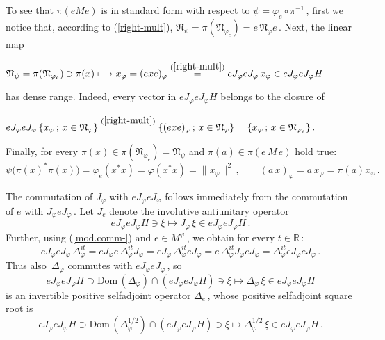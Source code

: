 \documentclass[reqno]{amsart}
\theoremstyle{definition}
\theoremstyle{remark}
\numberwithin{equation}{section}
\theoremstyle{plain}
\begin{document}
To see that $\pi (e M e)$ is in standard form with respect to
$\psi =\varphi_e\circ\pi^{-1}\,$, first we notice that, according
to (\ref{right-mult}), $\mathfrak N_\psi =
\pi (\mathfrak N_{\varphi_e}) =e\,\mathfrak N_\varphi e\,$.
Next, the linear map
\begin{center}
$\mathfrak N_\psi =\pi (\mathfrak N_{\varphi_e})\ni\pi (x)
\longmapsto x_\varphi =(e x e)_\varphi
\overset{(\ref{right-mult})}{=} eJ_\varphi eJ_\varphi\, x_\varphi
\in e J_\varphi e J_\varphi H$
\end{center}
\smallskip
has dense range. Indeed, every vector in $eJ_\varphi eJ_\varphi H$
belongs to the closure of
\begin{center}
$eJ_\varphi eJ_\varphi\,\{ x_\varphi\, ;\, x\in\mathfrak N_\varphi\}
\overset{(\ref{right-mult})}{=} \{ (e x e)_\varphi\, ;\,
x\in\mathfrak N_\varphi\} = \{ x_\varphi\, ;\, x\in
\mathfrak N_{\varphi_e} \}\, .$
\end{center}
\smallskip
Finally, for every $\pi (x)\in\pi (\mathfrak N_{\varphi_e})
=\mathfrak N_\psi$ and $\pi (a)\in\pi (e\, M\, e)$ hold true:
\begin{equation*}
\psi\big( \pi (x)^*\pi (x)\big) =\varphi_e (x^*x) =\varphi (x^*x)
=\| x_\varphi\|^2\, ,\qquad (a\, x)_\varphi =a\, x_\varphi =
\pi (a) x_\varphi\, .
\end{equation*}

The commutation of $J_\varphi$ with $e J_\varphi e J_\varphi$
follows immediately from the commutation of $e$ with $J_\varphi
e J_\varphi\,$. Let $J_e$ denote the involutive antiunitary
operator
\begin{equation*}
e J_\varphi e J_\varphi H\ni\xi\longmapsto J_\varphi\,\xi\in
e J_\varphi e J_\varphi H\, .
\end{equation*}
Further, using (\ref{mod.comm-}) and
$e\in M^\varphi\,$, we obtain for every $t\in\mathbb R\,$:
\begin{equation*}
e J_\varphi e J_\varphi\,\Delta_\varphi^{i t} =
e J_\varphi e\,\Delta_\varphi^{i t} J_\varphi =
e J_\varphi\,\Delta_\varphi^{i t} e J_\varphi =
e\,\Delta_\varphi^{i t} J_\varphi e J_\varphi =
\Delta_\varphi^{i t} e J_\varphi e J_\varphi\, .
\end{equation*}
Thus also $\,\Delta_\varphi$ commutes with $e J_\varphi e
J_\varphi\,$, so
\begin{equation*}
e J_\varphi e J_\varphi H\supset \text{Dom}\, (\Delta_\varphi )
\cap (e J_\varphi e J_\varphi H)\ni\xi\longmapsto \Delta_\varphi
\,\xi\in e J_\varphi e J_\varphi H
\end{equation*}
is an invertible positive selfadjoint operator $\Delta_e\,$,
whose positive selfadjoint square root is
\begin{equation*}
e J_\varphi e J_\varphi H\supset\text{Dom}\, (\Delta_\varphi^{1/2})
\cap (e J_\varphi e J_\varphi H)\ni\xi\longmapsto
\Delta_\varphi^{1/2}\,\xi\in e J_\varphi e J_\varphi H\, .
\end{equation*}
\end{document}
